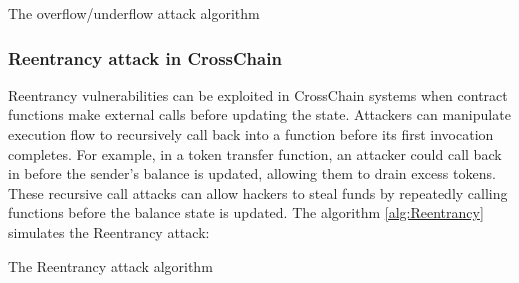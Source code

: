 \documentclass[sigconf]{acmart}
\begin{document}
\begin{algorithm}[h]
\caption{The overflow/underflow attack algorithm}
\label{alg:Overflow/Underflow}
\begin{flushleft}

\end{flushleft}
\end{algorithm}
\vspace{-1em}
\subsubsection{Reentrancy attack in CrossChain}
Reentrancy vulnerabilities can be exploited in CrossChain systems when contract functions make external calls before updating the state. Attackers can manipulate execution flow to recursively call back into a function before its first invocation completes. For example, in a token transfer function, an attacker could call back in before the sender's balance is updated, allowing them to drain excess tokens. These recursive call attacks can allow hackers to steal funds by repeatedly calling functions before the balance state is updated. The algorithm \ref{alg:Reentrancy} simulates the Reentrancy attack:

\begin{algorithm}[h]
\caption{The Reentrancy attack algorithm}
\label{alg:Reentrancy}
\begin{flushleft}

\end{flushleft}
\end{algorithm}
\end{document}
